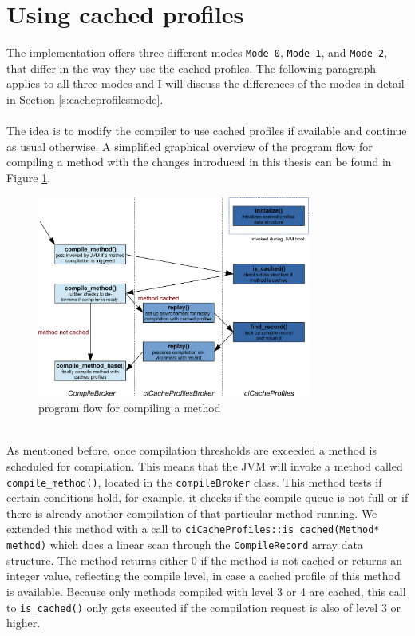 \section{Using cached profiles}
\label{s:usingprofiles}
The implementation offers three different modes \texttt{Mode 0}, \texttt{Mode 1}, and \texttt{Mode 2}, that differ in the way they use the cached profiles.
The following paragraph applies to all three modes and I will discuss the differences of the modes in detail in Section \ref{s:cacheprofilesmode}.
\\\\
The idea is to modify the compiler to use cached profiles if available and continue as usual otherwise.
A simplified graphical overview of the program flow for compiling a method with the changes introduced in this thesis can be found in Figure \ref{f:programflow}.
\begin{figure}[ht!]
  \begin{center}
    \centering
    \includegraphics[width=0.8\textwidth]{figures/program_flow.png}
    \caption{program flow for compiling a method}
    \label{f:programflow}
  \end{center}
\end{figure}\\
As mentioned before, once compilation thresholds are exceeded a method is scheduled for compilation. This means that the JVM will invoke a method called \texttt{compile\_method()}, located in the \texttt{compileBroker} class. This method tests if certain conditions hold, for example, it checks if the compile queue is not full or if there is already another compilation of that particular method running.
We extended this method with a call to \texttt{ciCacheProfiles::is\_cached(Method* method)} which does a linear scan through the \texttt{CompileRecord} array data structure. The method returns either 0 if the method is not cached or returns an integer value, reflecting the compile level, in case a cached profile of this method is available. Because only methods compiled with level 3 or 4 are cached, this call to \texttt{is\_cached()} only gets executed if the compilation request is also of level 3 or higher.\\\\
